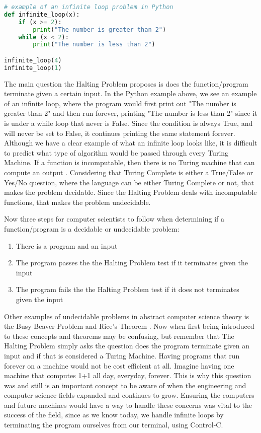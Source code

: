 \documentclass{article}
\begin{document}
\begin{lstlisting}[language=Python]
# example of an infinite loop problem in Python
def infinite_loop(x):
    if (x >= 2):
        print("The number is greater than 2")
    while (x < 2):
        print("The number is less than 2")

infinite_loop(4)
infinite_loop(1)

\end{lstlisting}
\noindent

 \medskip\noindent
 The main question the Halting Problem proposes is does the function/program terminate given a certain input. In the Python example above, we see an example of an infinite loop, where the program would first print out "The number is greater than 2" and then run forever, printing "The number is less than 2" since it is under a while loop that never is False. Since the condition is always True, and will never be set to False, it continues printing the same statement forever. Although we have a clear example of what an infinite loop looks like, it is difficult to predict what type of algorithm would be passed through every Turing Machine. If a function is incomputable, then there is no Turing machine that can compute an output \cite{Turing Completeness}. Considering that Turing Complete is either a True/False or Yes/No question, where the language can be either Turing Complete or not, that makes the problem decidable. Since the Halting Problem deals with incomputable functions, that makes the problem undecidable.
 
\medskip\noindent
Now three steps for computer scientists to follow when determining if a function/program is a decidable or undecidable problem: 
\begin{enumerate}
    \item There is a program and an input
    \item The program passes the the Halting Problem test if it terminates given the input
    \item The program fails the the Halting Problem test if it does not terminates given the input
\end{enumerate}

\medskip\noindent
Other examples of undecidable problems in abstract computer science theory is the Busy Beaver Problem and Rice's Theorem \cite{Undecidable Problems}. Now when first being introduced to these concepts and theorems may be confusing, but remember that The Halting Problem simply asks the question does the program terminate given an input and if that is considered a Turing Machine. Having programs that run forever on a machine would not be cost efficient at all. Imagine having one machine that computes 1+1 all day, everyday, forever. This is why this question was and still is an important concept to be aware of when the engineering and computer science fields expanded and continues to grow. Ensuring the computers and future machines would have a way to handle these concerns was vital to the success of the field, since as we know today, we handle infinite loops by terminating the program ourselves from our terminal, using Control-C. 
\end{document}
